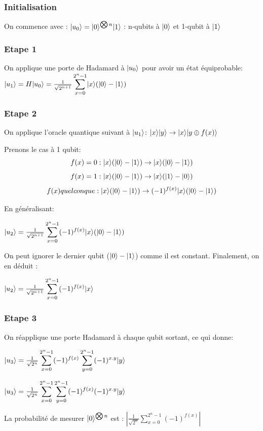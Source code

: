 \documentclass[12pt,a4paper]{article}
\DeclarePairedDelimiter\ket{\lvert}{\rangle}
\begin{document}
\subsubsection{Initialisation}
On commence avec :
$\ket{u_0} = \ket{0}^{\bigotimes n}\ket{1}$
: n-qubits à $\ket{0}$ et 1-qubit à $\ket{1}$

\subsubsection{Etape 1}

On applique une porte de Hadamard à $\ket{u_0}$ pour avoir un état équiprobable:
$\ket{u_1} = H\ket{u_0} = \frac{1}{\sqrt{2^{n + 1}}}
\displaystyle\sum_{x=0}^{2^n-1} \ket{x}(\ket{0} - \ket{1})$

\subsubsection{Etape 2}
On applique l'oracle quantique suivant à $\ket{u_1}$: $\ket{x}\ket{y}\rightarrow\ket{x}\ket{y\oplus f(x)}$

Prenons le cas à 1 qubit:
\[
f(x) = 0: \ket{x}(\ket{0} - \ket{1}) \rightarrow \ket{x}(\ket{0} - \ket{1})
\]
\[
f(x) = 1: \ket{x}(\ket{0} - \ket{1}) \rightarrow \ket{x}(\ket{1} - \ket{0})
\]
\[
f(x) quelconque: \ket{x}(\ket{0} - \ket{1}) \rightarrow (-1)^{f(x)}\ket{x}(\ket{0} - \ket{1})
\]

En généralisant:

$\ket{u_2} = \frac{1}{\sqrt{2^{n + 1}}}
\displaystyle\sum_{x=0}^{2^n-1} (-1)^{f(x)}\ket{x}(\ket{0} - \ket{1})$

On peut ignorer le dernier qubit ($\ket{0} - \ket{1}$) comme il est
constant. Finalement, on en déduit :

$\ket{u_2} = \frac{1}{\sqrt{2^{n + 1}}}
\displaystyle\sum_{x=0}^{2^n-1} (-1)^{f(x)}\ket{x}$

\subsubsection{Etape 3}
On réapplique une porte Hadamard à chaque qubit sortant, ce qui donne:

$\ket{u_3} = \frac{1}{\sqrt{2^{n}}}
\displaystyle\sum_{x=0}^{2^n-1} (-1)^{f(x)} \displaystyle\sum_{y=0}^{2^n-1} (-1)^{x.y}\ket{y}$

$\ket{u_3} = \frac{1}{\sqrt{2^{n}}}
\displaystyle\sum_{x=0}^{2^n-1} \displaystyle\sum_{y=0}^{2^n-1}(-1)^{f(x)} (-1)^{x.y}\ket{y}$

La probabilité de mesurer $\ket{0}^{\bigotimes n}$ est : 
$|\frac{1}{\sqrt{2^{n}}}\displaystyle\sum_{x=0}^{2^n-1}(-1)^{f(x)}|$
\end{document}
